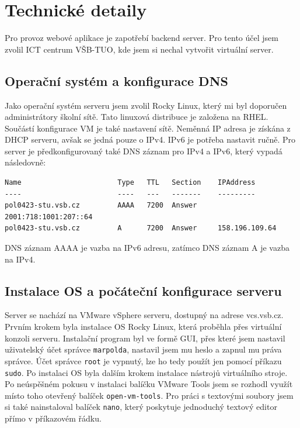 \chapter{Technické detaily}
Pro provoz webové aplikace je zapotřebí backend server.
Pro tento účel jsem zvolil ICT centrum VŠB-TUO, kde jsem si nechal
vytvořit virtuální server.

\section{Operační systém a konfigurace DNS}
Jako operační systém serveru jsem zvolil Rocky Linux,
který mi byl doporučen administrátory školní sítě. Tato linuxová
distribuce je založena na RHEL. Součástí konfigurace VM je také
nastavení sítě. Neměnná IP adresa je získána z DHCP serveru,
avšak se jedná pouze o IPv4. IPv6 je potřeba nastavit ručně.
Pro server je předkonfigurovaný také DNS záznam pro IPv4 a IPv6,
který vypadá následovně:

\begin{verbatim}
Name                       Type   TTL   Section    IPAddress
----                       ----   ---   -------    ---------
pol0423-stu.vsb.cz         AAAA   7200  Answer     2001:718:1001:207::64
pol0423-stu.vsb.cz         A      7200  Answer     158.196.109.64
\end{verbatim}

DNS záznam AAAA je vazba na IPv6 adresu, zatímco DNS záznam A
je vazba na IPv4.

\section{Instalace OS a počáteční konfigurace serveru}
Server se nachází na VMware vSphere serveru, dostupný
na adrese vcs.vsb.cz. Prvním krokem byla instalace OS Rocky Linux,
která proběhla přes virtuální konzoli serveru. Instalační program
byl ve formě GUI, přes které jsem nastavil uživatelský účet správce
\texttt{marpolda}, nastavil jsem mu heslo a zapnul mu práva správce.
Účet správce \texttt{root} je vypnutý, lze ho tedy použít jen pomocí
příkazu \texttt{sudo}. Po instalaci OS byla dalším krokem instalace
nástrojů virtuálního stroje. Po neúspěšném pokusu v instalaci balíčku
VMware Tools jsem se rozhodl využít místo toho otevřený balíček
\texttt{open-vm-tools}. Pro práci s textovými soubory jsem si
také nainstaloval balíček \texttt{nano}, který poskytuje jednoduchý
textový editor přímo v příkazovém řádku.

